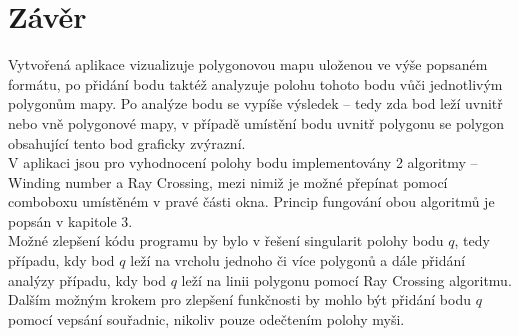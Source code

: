 \documentclass[11pt]{article}
\begin{document}

\section{Závěr}
Vytvořená aplikace vizualizuje polygonovou mapu uloženou ve výše popsaném formátu, po přidání bodu taktéž analyzuje polohu tohoto bodu vůči jednotlivým polygonům mapy. Po analýze bodu se vypíše výsledek – tedy zda bod leží uvnitř nebo vně polygonové mapy, v případě umístění bodu uvnitř polygonu se polygon obsahující tento bod graficky zvýrazní.\\

 V aplikaci jsou pro vyhodnocení polohy bodu implementovány 2 algoritmy – Winding number a Ray Crossing, mezi nimiž je možné přepínat pomocí comboboxu umístěném v pravé části okna. Princip fungování obou algoritmů je popsán v kapitole 3. \\

Možné zlepšení kódu programu by bylo v řešení singularit polohy bodu $q$, tedy případu, kdy bod $q$ leží na vrcholu jednoho či více polygonů a dále přidání analýzy případu, kdy bod $q$ leží na linii polygonu pomocí Ray Crossing algoritmu. Dalším možným krokem pro zlepšení funkčnosti by mohlo být přidání bodu $q$ pomocí vepsání souřadnic, nikoliv pouze odečtením polohy myši.
\end{document}
